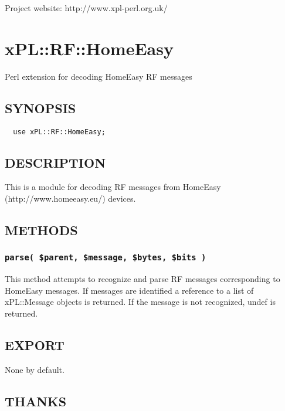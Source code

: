 \documentclass[12pt,a4paper]{article}
\begin{document}
Project website: http://www.xpl-perl.org.uk/

\newpage
\section{xPL::RF::HomeEasy\label{xPL::RF::HomeEasy}}


Perl extension for decoding HomeEasy RF messages

\subsection*{SYNOPSIS\label{xPL::RF::HomeEasy_SYNOPSIS}}
\begin{verbatim}
  use xPL::RF::HomeEasy;
\end{verbatim}
\subsection*{DESCRIPTION\label{xPL::RF::HomeEasy_DESCRIPTION}}


This is a module for decoding RF messages from HomeEasy
(http://www.homeeasy.eu/) devices.

\subsection*{METHODS\label{xPL::RF::HomeEasy_METHODS}}
\subsubsection*{\texttt{parse( \$parent, \$message, \$bytes, \$bits )}\label{xPL::RF::HomeEasy_parse_parent_message_bytes_bits_}}


This method attempts to recognize and parse RF messages corresponding
to HomeEasy messages.  If messages are identified a reference to a
list of xPL::Message objects is returned.  If the message is not
recognized, undef is returned.

\subsection*{EXPORT\label{xPL::RF::HomeEasy_EXPORT}}


None by default.

\subsection*{THANKS\label{xPL::RF::HomeEasy_THANKS}}
\end{document}
